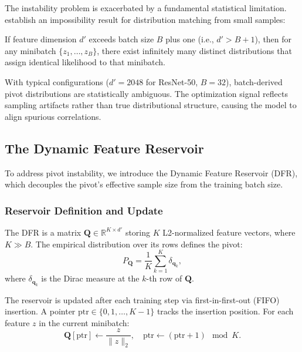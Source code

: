 \documentclass[preprint,12pt]{elsarticle}
\begin{document}
The instability problem is exacerbated by a fundamental statistical limitation. \citet{dong2025distribution} establish an impossibility result for distribution matching from small samples:

\begin{theorem}
\label{thm:impossibility}
If feature dimension $d'$ exceeds batch size $B$ plus one (i.e., $d' > B + 1$), then for any minibatch $\{z_1, \dots, z_B\}$, there exist infinitely many distinct distributions that assign identical likelihood to that minibatch.
\end{theorem}

With typical configurations ($d' = 2048$ for ResNet-50, $B = 32$), batch-derived pivot distributions are statistically ambiguous. The optimization signal reflects sampling artifacts rather than true distributional structure, causing the model to align spurious correlations.

\subsection{The Dynamic Feature Reservoir}
\label{ssec:dfr}

To address pivot instability, we introduce the Dynamic Feature Reservoir (DFR), which decouples the pivot's effective sample size from the training batch size.

\subsubsection{Reservoir Definition and Update}

The DFR is a matrix $\mathbf{Q} \in \mathbb{R}^{K \times d'}$ storing $K$ L2-normalized feature vectors, where $K \gg B$. The empirical distribution over its rows defines the pivot:
\begin{equation}
    P_{\mathbf{Q}} = \frac{1}{K} \sum_{k=1}^{K} \delta_{\mathbf{q}_k},
\end{equation}
where $\delta_{\mathbf{q}_k}$ is the Dirac measure at the $k$-th row of $\mathbf{Q}$.

The reservoir is updated after each training step via first-in-first-out (FIFO) insertion. A pointer $\text{ptr} \in \{0, 1, \dots, K-1\}$ tracks the insertion position. For each feature $z$ in the current minibatch:
\begin{equation}
    \mathbf{Q}[\text{ptr}] \leftarrow \frac{z}{\|z\|_2}, \quad \text{ptr} \leftarrow (\text{ptr} + 1) \mod K.
\end{equation}
\end{document}
